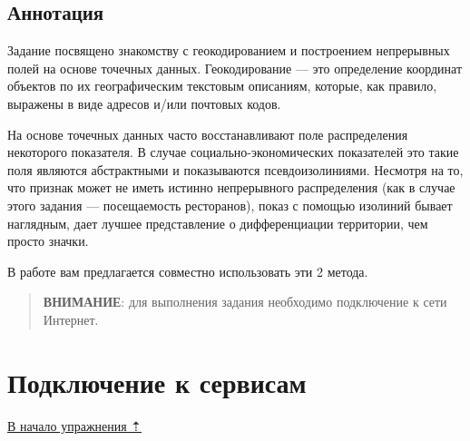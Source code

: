 \documentclass[]{book}
\theoremstyle{definition}
\theoremstyle{definition}
\theoremstyle{definition}
\theoremstyle{remark}
\begin{document}
\hypertarget{geocoding-annotation}{%
\subsection{Аннотация}\label{geocoding-annotation}}

Задание посвящено знакомству с геокодированием и построением непрерывных
полей на основе точечных данных. Геокодирование --- это определение
координат объектов по их географическим текстовым описаниям, которые,
как правило, выражены в виде адресов и/или почтовых кодов.

На основе точечных данных часто восстанавливают поле распределения
некоторого показателя. В случае социально-экономических показателей это
такие поля являются абстрактными и показываются псевдоизолиниями.
Несмотря на то, что признак может не иметь истинно непрерывного
распределения (как в случае этого задания --- посещаемость ресторанов),
показ с помощью изолиний бывает наглядным, дает лучшее представление о
дифференциации территории, чем просто значки.

В работе вам предлагается совместно использовать эти 2 метода.

\begin{quote}
\textbf{ВНИМАНИЕ}: для выполнения задания необходимо подключение к сети
Интернет.
\end{quote}

\hypertarget{geocoding-connection}{%
\section{Подключение к сервисам}\label{geocoding-connection}}

\protect\hyperlink{geocoding}{В начало упражнения ⇡}
\end{document}
